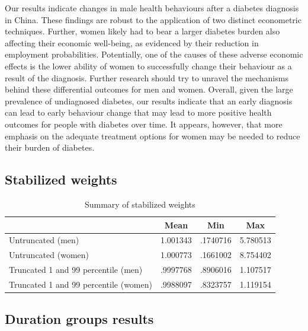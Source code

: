 Our results indicate changes in male health behaviours after a diabetes diagnosis in China. These findings are robust to the application of two distinct econometric techniques. Further, women likely had to bear a larger diabetes burden also affecting their economic well-being, as evidenced by their reduction in employment probabilities. Potentially, one of the causes of these adverse economic effects is the lower ability of women to successfully change their behaviour as a result of the diagnosis. Further research should try to unravel the mechanisms behind these differential outcomes for men and women. Overall, given the large prevalence of undiagnosed diabetes, our results indicate that an early diagnosis can lead to early behaviour change that may lead to more positive health outcomes for people with diabetes over time. It appears, however, that more emphasis on the adequate treatment options for women may be needed to reduce their burden of diabetes. 

\clearpage

\subsection*{Stabilized weights}

\begin{table}[h]
\caption{\label{tab:stabweights}Summary of stabilized weights}
\begin{adjustbox}{max width=\linewidth}  
{
\def\sym#1{\ifmmode^{#1}\else\(^{#1}\)\fi}
\begin{tabular}{l*{1}{ccc}}
\toprule
                    &        Mean&         Min&         Max\\
\midrule
Untruncated (men)   &    1.001343&    .1740716&   5.780513\\
Untruncated (women) &    1.000773&   .1661002&  8.754402\\
Truncated 1 and 99 percentile (men)&    .9997768&    .8906016&    1.107517\\
Truncated 1 and 99 percentile (women)&    .9988097&    .8323757&    1.119154\\
\end{tabular}
}
\end{adjustbox}
\end{table}

\FloatBarrier


\subsection{Duration groups results}


